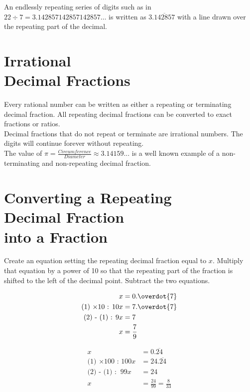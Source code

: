 \documentclass{article}
\begin{document}
An endlessly repeating series of digits such as in $22 \div 7 = 3.142857142857142857\dots$ is written as $3.\overline{142857}$ with a line drawn over the repeating part of the decimal.\\

\section{Irrational\\Decimal Fractions}

Every rational number can be written as either a repeating or terminating decimal fraction. All repeating decimal fractions can be converted to exact fractions or ratios.\\

Decimal fractions that do not repeat or terminate are irrational numbers. The digits will continue forever without repeating.\\

The value of $\pi = \frac{Circumference}{Diameter} \approx 3.14159...$ is a well known example of a non-terminating and non-repeating decimal fraction.\\

\newpage

\section{Converting a Repeating\\Decimal Fraction\\into a Fraction}

Create an equation setting the repeating decimal fraction  equal to $x$. Multiply that equation by a power of 10 so that the repeating part of the fraction is shifted to the left of the decimal point. Subtract the two equations.


\begin{align}
                            x&=0.\overdot{7}\\
\text{(1) $\times 10$ : } 10x&=7.\overdot{7}\\
      \text{(2) - (1) : }  9x&=7\\
                            x&=\frac{7}{9}
\end{align}

\setcounter{equation}{0}

\begin{align}
x&=0.\overline{24}\\
\text{(1) $\times 100$ : }
100x&=24.\overline{24}\\
\text{(2) - (1) : }
\ 99x&=24\\
x&=\frac{24}{99}=\frac{8}{33}
\end{align}
\end{document}
